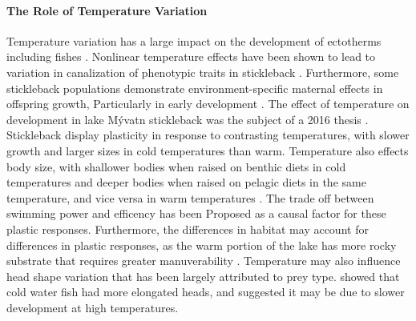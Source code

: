 \documentclass[12pt]{extarticle}
\begin{document}
\paragraph{The Role of Temperature Variation}
Temperature variation has a large impact on the development of ectotherms including fishes \citep{Massey2021}. Nonlinear temperature effects have been shown to lead to variation in canalization of phenotypic traits in stickleback \citep{Ramler2014}. Furthermore, some stickleback populations demonstrate environment-specific maternal effects in offspring growth, Particularly in early development \citep{Ramler2014, Shama2014b}. The effect of temperature on development in lake M\'yvatn stickleback was the subject of a 2016 thesis \citep{Delarue}. Stickleback display plasticity in response to contrasting temperatures, with slower growth and larger sizes in cold temperatures than warm. Temperature also effects body size, with shallower bodies when raised on benthic diets in cold temperatures and deeper bodies when raised on pelagic diets in the same temperature, and vice versa in warm temperatures \citep{Delarue}. The trade off between swimming power and efficency has been Proposed as a causal factor for these plastic responses. Furthermore, the differences in habitat may account for differences in plastic responses, as the warm portion of the lake has more rocky 
substrate that requires greater manuverability \citep{Delarue}. Temperature may also influence head shape variation that has been largely attributed to prey type. \citet{Delarue} showed that cold water fish had more elongated heads, and suggested it may be due to slower development at high temperatures.
\end{document}
